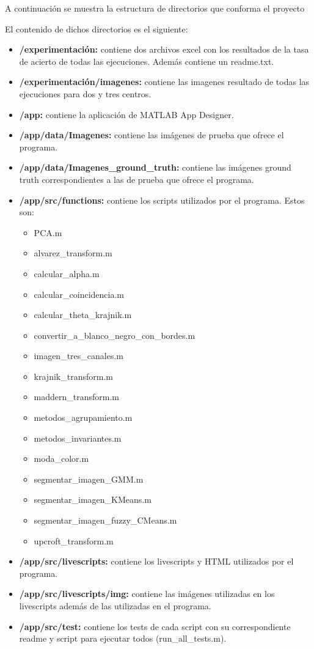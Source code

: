 A continuación se muestra la estructura de directorios que conforma el proyecto


El contenido de dichos directorios es el siguiente:

\begin{itemize}
    \item \textbf{/experimentación:} contiene dos archivos excel con los resultados de la tasa de acierto de todas las ejecuciones. Además contiene un readme.txt.
    \item \textbf{/experimentación/imagenes:} contiene las imagenes resultado de todas las ejecuciones para dos y tres centros.
    \item \textbf{/app:} contiene la aplicación de MATLAB App Designer.
    \item \textbf{/app/data/Imagenes:} contiene las imágenes de prueba que ofrece el programa.
    \item \textbf{/app/data/Imagenes\_ground\_truth:} contiene las imágenes ground truth correspondientes a las de prueba que ofrece el programa.
    \item \textbf{/app/src/functions:} contiene los scripts utilizados por el programa. Estos son:
    \begin{itemize}
        \item PCA.m
        \item alvarez\_transform.m
        \item calcular\_alpha.m
        \item calcular\_coincidencia.m
        \item calcular\_theta\_krajnik.m
        \item convertir\_a\_blanco\_negro\_con\_bordes.m
        \item imagen\_tres\_canales.m
        \item krajnik\_transform.m
        \item maddern\_transform.m
        \item metodos\_agrupamiento.m
        \item metodos\_invariantes.m
        \item moda\_color.m
        \item segmentar\_imagen\_GMM.m
        \item segmentar\_imagen\_KMeans.m
        \item segmentar\_imagen\_fuzzy\_CMeans.m
        \item upcroft\_transform.m
    \end{itemize}
    \item \textbf{/app/src/livescripts:} contiene los livescripts y HTML utilizados por el programa.
    \item \textbf{/app/src/livescripts/img:} contiene las imágenes utilizadas en los livescripts además de las utilizadas en el programa.
    \item \textbf{/app/src/test:} contiene los tests de cada script con su correspondiente readme y script para ejecutar todos (run\_all\_tests.m).
\end{itemize}